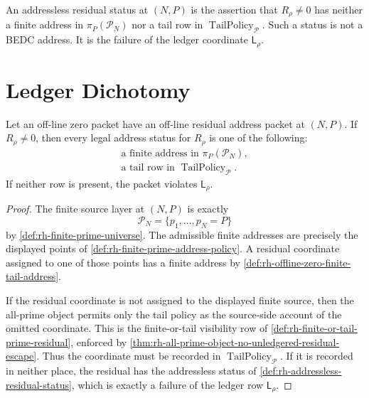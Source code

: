\begin{definition}
\label{def:rh-addressless-residual-status}
An addressless residual status at $(N,P)$ is the assertion that
$R_\rho\ne0$ has neither a finite address in
$\pi_P(\mathcal P_N)$ nor a tail row in
$\operatorname{TailPolicy}_{\mathcal P}$.  Such a status is not a BEDC
address.  It is the failure of the ledger coordinate
$\mathsf L_\rho$.
\end{definition}

\section{Ledger Dichotomy}
\label{sec:rh-offline-zero-finite-or-tail-ledger-dichotomy}

\begin{theorem}
\label{thm:rh-ledgered-residual-has-finite-or-tail-address}
Let an off-line zero packet have an off-line residual address packet at
$(N,P)$.  If $R_\rho\ne0$, then every legal address status for
$R_\rho$ is one of the following:
$$
\begin{gathered}
\text{a finite address in }\pi_P(\mathcal P_N),\\
\text{a tail row in }\operatorname{TailPolicy}_{\mathcal P}.
\end{gathered}
$$
If neither row is present, the packet violates $\mathsf L_\rho$.
\end{theorem}

\begin{proof}
The finite source layer at $(N,P)$ is exactly
$$
\mathcal P_N=\{p_1,\ldots,p_N=P\}
$$
by \autoref{def:rh-finite-prime-universe}.  The admissible finite
addresses are precisely the displayed points of
\autoref{def:rh-finite-prime-address-policy}.  A residual coordinate
assigned to one of those points has a finite address by
\autoref{def:rh-offline-zero-finite-tail-address}.

If the residual coordinate is not assigned to the displayed finite
source, then the all-prime object permits only the tail policy as the
source-side account of the omitted coordinate.  This is the
finite-or-tail visibility row of
\autoref{def:rh-finite-or-tail-prime-residual}, enforced by
\autoref{thm:rh-all-prime-object-no-unledgered-residual-escape}.  Thus
the coordinate must be recorded in
$\operatorname{TailPolicy}_{\mathcal P}$.  If it is recorded in neither
place, the residual has the addressless status of
\autoref{def:rh-addressless-residual-status}, which is exactly a
failure of the ledger row $\mathsf L_\rho$.
\end{proof}

